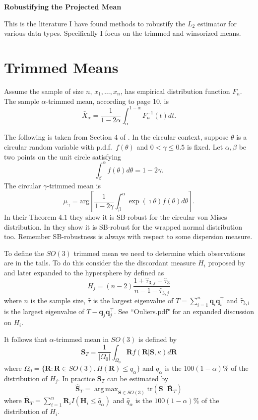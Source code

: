 \documentclass{article}\usepackage[]{graphicx}\usepackage[]{color}
\DeclareMathOperator*{\argmax}{arg\,max}
\newcommand{\TrimMean}{{\widehat{\bm S}_T}}
\begin{document}
\begin{center}
\Large{\bf Robustifying the Projected Mean}
\end{center}
\normalsize
This is the literature I have found methods to robustify the $L_2$ estimator for various data types.  Specifically I focus on the trimmed and winsorized means.



 
\section{Trimmed Means}

Assume the sample of size $n$, $x_1,\dots,x_n$, has empirical distribution function $F_n$.  The sample $\alpha$-trimmed mean, according to \cite{huber2009} page 10, is
\[
\bar{X}_\alpha=\frac{1}{1-2\alpha}\int_{\alpha}^{1-\alpha}F_n^{-1}(t)dt.
\]

The following is taken from Section 4 of \cite{laha2011}. In the circular context, suppose $\theta$ is a circular random variable with p.d.f.~$f(\theta)$ and $0<\gamma\leq 0.5$ is fixed.  Let $\alpha,\beta$ be two points on the unit circle satisfying
\[
\int_{\beta}^\alpha f(\theta)d\theta=1-2\gamma.
\] 
The circular $\gamma$-trimmed mean is
\[
\mu_\gamma=\text{arg}\left[\frac{1}{1-2\gamma}\int^{\alpha}_\beta\exp(\imath\theta)f(\theta)d\theta\right].
\]
In their Theorem 4.1 they show it is SB-robust for the circular von Mises distribution.  In \cite{laha2013} they show it is SB-robust for the wrapped normal distribution too.  Remember SB-robustness is always with respect to some dispersion measure.


To define the $SO(3)$ trimmed mean we need to determine which observations are in the tails.  To do this consider the the discordant measure $H_i$ proposed by \cite{best1986} and later expanded to the hypersphere by \cite{figueiredo2005} defined as 
\begin{equation}\label{eqn:Hj}
H_j=(n-2)\frac{1+\hat\tau_{3,j}-\hat\tau_3}{n-1-\hat\tau_{3,j}}
\end{equation}
where $n$ is the sample size, $\hat{\tau}$ is the largest eigenvalue of $T=\sum_{i=1}^n\bm q_i\bm q_i^\top$ and $\hat\tau_{3,i}$ is the largest eigenvalue of $T-\bm q_j\bm q_j^\top$.  See ``Ouliers.pdf" for an expanded discussion on $H_i$.

It follows that $\alpha$-trimmed mean in $SO(3)$ is defined by
\[
\bm S_{T}=\frac{1}{|\Omega_0|}\int_{\Omega_0}\bm Rf(\bm R|\bm S,\kappa)d\bm R
\]
where $\Omega_0=\{\bm R:\bm R\in SO(3), H(\bm R)\leq q_{\alpha}\}$ and $q_\alpha$ is the $100(1-\alpha)\%$ of the distribution of $H_j$.  In practice $\bm S_T$ can be estimated by
\[
\TrimMean=\argmax_{\bm S\in SO(3)}\text{tr}(\bm S^\top\overline{\bm R}_T)
\]
where $\overline{\bm R}_T=\sum_{i=1}^n\bm R_iI(\bm H_i\leq \hat q_{\alpha})$ and $\hat q_{\alpha}$ is the $100(1-\alpha)\%$ of the distribution of $H_i$.
\end{document}

